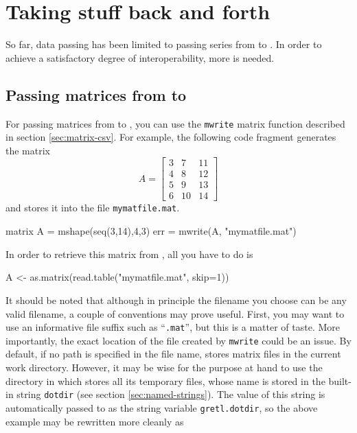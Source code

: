\section{Taking stuff back and forth}
\label{sec:R-passing-data}

So far, data passing has been limited to passing series from
 to . In order to achieve a satisfactory degree of
interoperability, more is needed.

\subsection{Passing matrices from  to }

For passing matrices from  to , you can use the
\texttt{mwrite} matrix function described in section
\ref{sec:matrix-csv}. For example, the following  code
fragment generates the matrix 
\[ 
A = \left[
  \begin{array}{ccc}
    3 &  7 &  11 \\ 
    4 &  8 &  12 \\ 
    5 &  9 &  13 \\ 
    6 & 10 &  14 
  \end{array}
\right]
\] 
and stores it into the file \texttt{mymatfile.mat}.
\begin{code}
  matrix A = mshape(seq(3,14),4,3)
  err = mwrite(A, "mymatfile.mat")
\end{code}
In order to retrieve this matrix from , all you have to do is
\begin{code}
  A <- as.matrix(read.table("mymatfile.mat", skip=1))
\end{code}

It should be noted that although in principle the filename you choose
can be any valid filename, a couple of conventions may prove
useful. First, you may want to use an informative file suffix such as
``\texttt{.mat}'', but this is a matter of taste. More importantly,
the exact location of the file created by \texttt{mwrite} could be an
issue. By default, if no path is specified in the file name,
 stores matrix files in the current work
directory. However, it may be wise for the purpose at hand to use the
directory in which  stores all its temporary files, whose
name is stored in the built-in string \texttt{dotdir} (see section
\ref{sec:named-strings}). The value of this string is automatically
passed to  as the string variable \texttt{gretl.dotdir}, so
the above example may be rewritten more cleanly as

